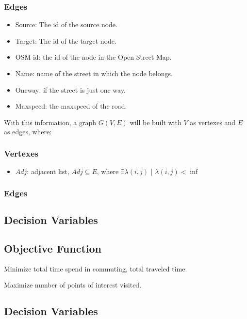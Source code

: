 \documentclass{article}
\begin{document}
    \subsubsection*{Edges}
    \begin{itemize}
        \item Source: The id of the source node. 
        \item Target: The id of the target node. 
        \item OSM id: the id of the node in the Open Street Map. 
        \item Name: name of the street in which the node belongs. 
        \item Oneway: if the street is just one way.
        \item Maxspeed: the maxspeed of the road.
    \end{itemize}
    
    With this information, a graph $G(V,E)$ will be built with $V$ as vertexes and $E$ as edges, where:
    \subsubsection*{Vertexes}
    \begin{itemize}
        \item $Adj$: adjacent list, $Adj \subseteq E$, where $\exists \lambda(i,j)$ | $\lambda(i,j) < \inf$
    \end{itemize} 
    
    \subsubsection*{Edges} 
    
        
\subsection*{Decision Variables}

\subsection*{Objective Function}

Minimize total time spend in commuting, total traveled time. \par
Maximize number of points of interest visited.

\subsection*{Decision Variables}
\end{document}
